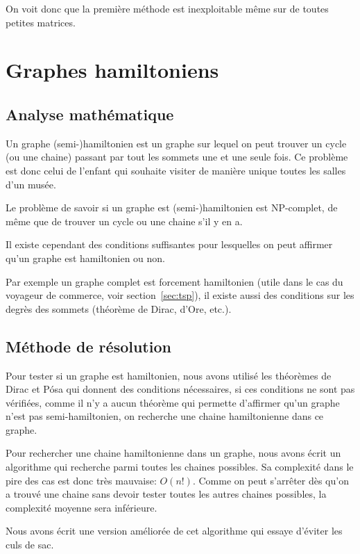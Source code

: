 \documentclass{scrartcl}
\begin{document}
    On voit donc que la première méthode est inexploitable même sur de toutes
    petites matrices.

\section{Graphes hamiltoniens}
  \subsection{Analyse mathématique}
    Un graphe (semi-)hamiltonien est un graphe sur lequel on peut
    trouver un cycle (ou une chaine) passant par tout les sommets une et une
    seule fois. Ce problème est donc celui de l'enfant qui souhaite visiter de
    manière unique toutes les salles d'un musée.

    Le problème de savoir si un graphe est (semi-)hamiltonien est NP-complet,
    de même que de trouver un cycle ou une chaine s'il y en a.

    Il existe cependant des conditions suffisantes pour lesquelles on peut
    affirmer qu'un graphe est hamiltonien ou non.

    Par exemple un graphe complet est forcement hamiltonien (utile dans le cas
    du voyageur de commerce, voir section~\ref{sec:tsp}), il existe aussi des
    conditions sur les degrès des sommets (théorème de Dirac, d'Ore, etc.).

  \subsection{Méthode de résolution}
    Pour tester si un graphe est hamiltonien, nous avons utilisé les théorèmes
    de Dirac et Pósa qui donnent des conditions nécessaires, si ces conditions
    ne sont pas vérifiées, comme il n'y a aucun théorème qui permette
    d'affirmer qu'un graphe n'est pas semi-hamiltonien, on recherche une chaine
    hamiltonienne dans ce graphe.

    Pour rechercher une chaine hamiltonienne dans un graphe, nous avons écrit un
    algorithme qui recherche parmi toutes les chaines possibles. Sa complexité
    dans le pire des cas est donc très mauvaise: $O(n!)$. Comme on peut
    s'arrêter dès qu'on a trouvé une chaine sans devoir tester toutes les autres
    chaines possibles, la complexité moyenne sera inférieure.

    Nous avons écrit une version améliorée de cet algorithme qui essaye
    d'éviter les culs de sac.
\end{document}
